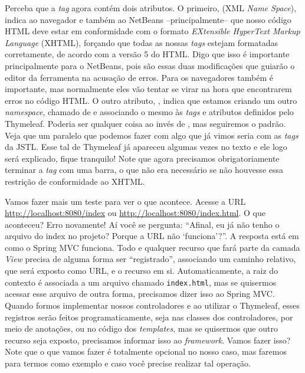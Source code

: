 Perceba que a \textit{tag}  agora contém dois atributos. O primeiro,  (XML \textit{Name Space}), indica ao navegador e também ao NetBeans --principalmente-- que nosso código HTML deve estar em conformidade com o formato \textit{EXtensible HyperText Markup Language} (XHTML), forçando que todas as nossas \textit{tags} estejam formatadas corretamente, de acordo com a versão 5 do HTML. Digo que isso é importante principalmente para o NetBeans, pois são essas duas modificações que guiarão o editor da ferramenta na acusação de erros. Para os navegadores também é importante, mas normalmente eles vão tentar se virar na hora que encontrarem erros no código HTML. O outro atributo, , indica que estamos criando um outro \textit{namespace}, chamado de  e associando o mesmo às \textit{tags} e atributos definidos pelo Thymeleaf. Poderia ser qualquer coisa ao invés de , mas seguiremos o padrão. Veja que um paralelo que podemos fazer com algo que já vimos seria com as \textit{tags} da JSTL. Esse tal de Thymeleaf já apareceu algumas vezes no texto e ele logo será explicado, fique tranquilo! Note que agora precisamos obrigatoriamente terminar a \textit{tag}  com uma barra, o que não era necessário se não houvesse essa restrição de conformidade ao XHTML.

Vamos fazer mais um teste para ver o que acontece. Acesse a URL \url{http://localhost:8080/index} ou \url{http://localhost:8080/index.html}. O que aconteceu? Erro novamente! Aí você se pergunta: ``Afinal, eu já não tenho o arquivo do index no projeto? Porque a URL não `funciona'?''. A resposta está em como o Spring MVC funciona. Todo e qualquer recurso que fará parte da camada \textit{View} precisa de alguma forma ser ``registrado'', associando um caminho relativo, que será exposto como URL, e o recurso em si. Automaticamente, a raiz do contexto é associada a um arquivo chamado \texttt{index.html}, mas se quisermos acessar esse arquivo de outra forma, precisamos dizer isso ao Spring MVC. Quando formos implementar nossos controladores e ao utilizar o Thymeleaf, esses registros serão feitos programaticamente, seja nas classes dos controladores, por meio de anotações, ou no código dos \textit{templates}, mas se quisermos que outro recurso seja exposto, precisamos informar isso ao \textit{framework}. Vamos fazer isso? Note que o que vamos fazer é totalmente opcional no nosso caso, mas faremos para termos como exemplo e caso você precise realizar tal operação.



